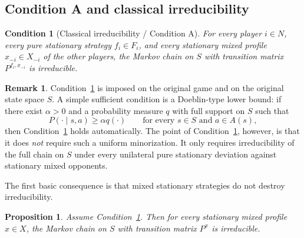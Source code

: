 \documentclass[11pt]{article}
\newtheorem{proposition}[theorem]{Proposition}
\newtheorem{condition}[theorem]{Condition}
\theoremstyle{definition}
\newtheorem{remark}[theorem]{Remark}
\newcommand{\1}{\mathbf{1}}
\begin{document}
\subsection{Condition A and classical irreducibility}

\begin{condition}[Classical irreducibility / Condition A]\label{cond:A}
For every player $i\in N$, every pure stationary strategy $f_i\in F_i$, and every stationary mixed profile $x_{-i}\in X_{-i}$ of the other players, the Markov chain on $S$ with transition matrix $P^{f_i,x_{-i}}$ is irreducible.
\end{condition}

\begin{remark}
Condition~\ref{cond:A} is imposed on the original game and on the original state space $S$. A simple sufficient condition is a Doeblin-type lower bound: if there exist $\alpha>0$ and a probability measure $q$ with full support on $S$ such that
\[
P(\cdot\mid s,a)\ge \alpha q(\cdot)\qquad\text{for every }s\in S\text{ and }a\in A(s),
\]
then Condition~\ref{cond:A} holds automatically. The point of Condition~\ref{cond:A}, however, is that it does \emph{not} require such a uniform minorization. It only requires irreducibility of the full chain on $S$ under every unilateral pure stationary deviation against stationary mixed opponents.
\end{remark}

The first basic consequence is that mixed stationary strategies do not destroy irreducibility.

\begin{proposition}\label{prop:mixed-irreducible}
Assume Condition~\ref{cond:A}. Then for every stationary mixed profile $x\in X$, the Markov chain on $S$ with transition matrix $P^x$ is irreducible.
\end{proposition}
\end{document}
